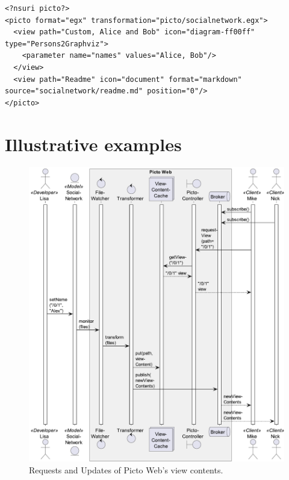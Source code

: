 \documentclass[preprint,12pt, a4paper]{elsarticle}
\begin{document}
\begin{lstlisting}[firstnumber=1,style=picto,caption={The Picto file that binds the model and the visualisation transformation.},label=lst:picto,float]
<?nsuri picto?>
<picto format="egx" transformation="picto/socialnetwork.egx">
  <view path="Custom, Alice and Bob" icon="diagram-ff00ff" type="Persons2Graphviz">
    <parameter name="names" values="Alice, Bob"/>
  </view>        
  <view path="Readme" icon="document" format="markdown" source="socialnetwork/readme.md" position="0"/>
</picto>
\end{lstlisting}

\section{Illustrative examples}
\begin{figure}[h]
  \centering
  \includegraphics[width=1\linewidth]{images/sequence}
  \caption{Requests and Updates of Picto Web's view contents.}
  \label{fig:sequence}
\end{figure}
\end{document}
